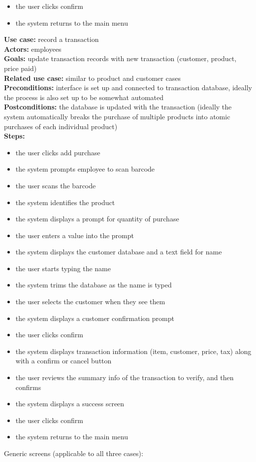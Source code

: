 \documentclass[notitlepage, 11pt]{report}
\begin{document}
\begin{enumerate}[itemindent=-1.5em]
\begin{itemize}
		\item the user clicks confirm 
		\item the system returns to the main menu
		\end{itemize}
	\textbf{Use case:} record a transaction\\
	\textbf{Actors:} employees\\
	\textbf{Goals:} update transaction records with new transaction (customer, product, price paid)\\
	\textbf{Related use case:} similar to product and customer cases\\
	\textbf{Preconditions:} interface is set up and connected to transaction database, ideally the process is also set up to be somewhat automated\\
	\textbf{Postconditions:} the database is updated with the transaction (ideally the system automatically breaks the purchase of multiple products into atomic purchases of each individual product)\\
	\textbf{Steps:} 
		\begin{itemize}
		\item the user clicks add purchase
		\item the system prompts employee to scan barcode
		\item the user scans the barcode 
		\item the system identifies the product
		\item the system displays a prompt for quantity of purchase
		\item the user enters a value into the prompt
		\item the system displays the customer database and a text field for name
		\item the user starts typing the name
		\item the system trims the database as the name is typed
		\item the user selects the customer when they see them
		\item the system displays a customer confirmation prompt
		\item the user clicks confirm
		\item the system displays transaction information (item, customer, price, tax) along with a confirm or cancel button
		\item the user reviews the summary info of the transaction to verify, and then confirms
		\item the system displays a success screen
		\item the user clicks confirm
		\item the system returns to the main menu
		\end{itemize}
	\begin{center} 
	Generic screens (applicable to all three cases):
	

\end{center}
\end{enumerate}
\end{document}
